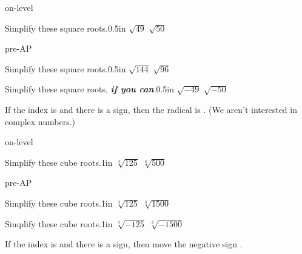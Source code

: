 \begin{taggedblock}{on-level}
    \begin{myProblems2}{Simplify these square roots.}{0.5in}
        {
            $\sqrt{49}$ 
        }
        {
            $\sqrt{50}$ 
        }
    \end{myProblems2}
\end{taggedblock}
\begin{taggedblock}{pre-AP}
    \begin{myProblems2}{Simplify these square roots.}{0.5in}
        {
                $\sqrt{144}$ 
            }
            {
                $\sqrt{96}$ 
            }
    \end{myProblems2}
\end{taggedblock}

\begin{myProblems2}{Simplify these square roots, {\bfseries\itshape if you can}.}{0.5in}
    {
        $\sqrt{-49}$ 
    }
    {
        $\sqrt{-50}$ 
    }
\end{myProblems2}

\begin{myCenteredBox}[width=6in]
    If the index is  and there is a  sign,
    then the radical is .
    (We aren't interested in complex numbers.)
\end{myCenteredBox}




\begin{taggedblock}{on-level}
    \begin{myProblems2}{Simplify these cube roots.}{1in}
        {
            $\sqrt[3]{125}$ 
        }
        {
            $\sqrt[3]{500}$ 
        }
    \end{myProblems2}
\end{taggedblock}
\begin{taggedblock}{pre-AP}
    \begin{myProblems2}{Simplify these cube roots.}{1in}
        {
            $\sqrt[3]{125}$ 
        }
        {
            $\sqrt[3]{1500}$ 
        }
    \end{myProblems2}
\end{taggedblock}
\begin{myProblems2}{Simplify these cube roots.}{1in}
    {
        $\sqrt[3]{-125}$ 
    }
    {
        $\sqrt[3]{-1500}$ 
    }
\end{myProblems2}

\begin{myCenteredBox}[width=6in]
    If the index is  and there is a  sign,
    then move the negative sign .
\end{myCenteredBox}



